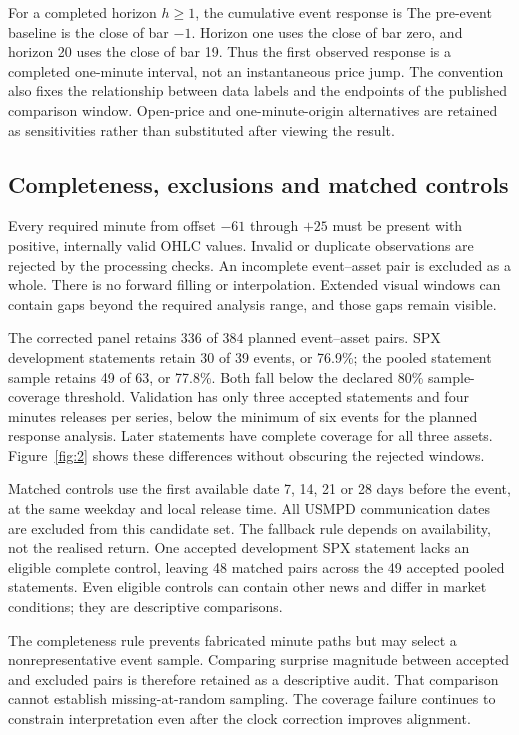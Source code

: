 For a completed horizon $h\geq1$, the cumulative event response is
The pre-event baseline is the close of bar $-1$. Horizon one uses the close of bar zero, and horizon 20 uses the close of bar 19. Thus the first observed response is a completed one-minute interval, not an instantaneous price jump. The convention also fixes the relationship between data labels and the endpoints of the published comparison window. Open-price and one-minute-origin alternatives are retained as sensitivities rather than substituted after viewing the result.

\subsection{Completeness, exclusions and matched controls}
Every required minute from offset $-61$ through $+25$ must be present with positive, internally valid OHLC values. Invalid or duplicate observations are rejected by the processing checks. An incomplete event--asset pair is excluded as a whole. There is no forward filling or interpolation. Extended visual windows can contain gaps beyond the required analysis range, and those gaps remain visible.


The corrected panel retains 336 of 384 planned event--asset pairs. SPX development statements retain 30 of 39 events, or 76.9\%; the pooled statement sample retains 49 of 63, or 77.8\%. Both fall below the declared 80\% sample-coverage threshold. Validation has only three accepted statements and four minutes releases per series, below the minimum of six events for the planned response analysis. Later statements have complete coverage for all three assets. Figure~\ref{fig:2} shows these differences without obscuring the rejected windows.


Matched controls use the first available date 7, 14, 21 or 28 days before the event, at the same weekday and local release time. All USMPD communication dates are excluded from this candidate set. The fallback rule depends on availability, not the realised return. One accepted development SPX statement lacks an eligible complete control, leaving 48 matched pairs across the 49 accepted pooled statements. Even eligible controls can contain other news and differ in market conditions; they are descriptive comparisons.

The completeness rule prevents fabricated minute paths but may select a nonrepresentative event sample. Comparing surprise magnitude between accepted and excluded pairs is therefore retained as a descriptive audit. That comparison cannot establish missing-at-random sampling. The coverage failure continues to constrain interpretation even after the clock correction improves alignment.

